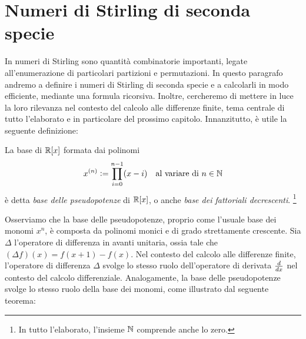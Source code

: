 \section{Numeri di Stirling di seconda specie} \label{sec:stirling}

In numeri di Stirling sono quantità combinatorie importanti,
legate all'enumerazione di particolari partizioni e permutazioni.
In questo paragrafo andremo a definire i numeri di Stirling di seconda specie
e a calcolarli in modo efficiente, mediante una formula ricorsiva.
Inoltre, cercheremo di mettere in luce la loro rilevanza nel contesto
del calcolo alle differenze finite, tema centrale di tutto l'elaborato
e in particolare del prossimo capitolo.
Innanzitutto, è utile la seguente definizione:

%	

\begin{defi}
La base di $\mathbb{R}[x]$ formata dai polinomi
\begin{equation} \label{eq:pseudopotenze}
x^{(n)} \vcentcolon= \prod_{i = 0}^{n-1} (x-i)
\quad \text{al variare di $n \in \mathbb{N}$}
\end{equation}
è detta \emph{base delle pseudopotenze} di $\mathbb{R}[x]$,
o anche \emph{base dei fattoriali decrescenti}.%
\footnote{In tutto l'elaborato, l'insieme $\mathbb{N}$ comprende anche lo zero.}
\end{defi}

Osserviamo che la base delle pseudopotenze, proprio come l'usuale
base dei monomi $x^n$, è composta da polinomi monici e di grado
strettamente crescente.
Sia $\Delta$ l'operatore di differenza in avanti unitaria, ossia
tale che $(\Delta f)(x) = f(x+1)-f(x)$.
Nel contesto del calcolo alle differenze finite,
l'operatore di differenza $\Delta$ svolge lo stesso
ruolo dell'operatore di derivata $\cramped{\frac{d}{dx}}$
nel contesto del calcolo differenziale.
Analogamente, la base delle pseudopotenze svolge lo stesso ruolo
della base dei monomi, come illustrato dal seguente teorema:

